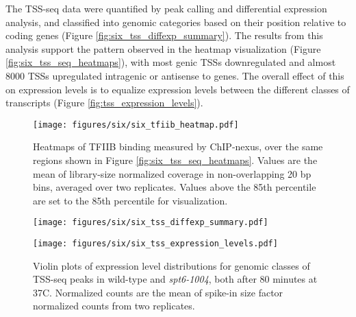 The TSS-seq data were quantified by peak calling and differential expression analysis, and classified into genomic categories based on their position relative to coding genes (Figure \ref{fig:six_tss_diffexp_summary}).
The results from this analysis support the pattern observed in the heatmap visualization (Figure \ref{fig:six_tss_seq_heatmaps}), with most genic TSSs downregulated and almost 8000 TSSs upregulated intragenic or antisense to genes.
The overall effect of this on expression levels is to equalize expression levels between the different classes of transcripts (Figure \ref{fig:tss_expression_levels}).

\begin{wrapfigure}[19]{R}{3in}
\centering
\texttt{[image: figures/six/six\_tfiib\_heatmap.pdf]}
\caption[Heatmaps of TFIIB ChIP-nexus protection over non-overlapping coding genes, from wild-type and \textit{spt6-1004} cells, both after 80 minutes at 37\textdegree C]{Heatmaps of TFIIB binding measured by ChIP-nexus, over the same regions shown in Figure \ref{fig:six_tss_seq_heatmaps}. Values are the mean of library-size normalized coverage in non-overlapping 20 bp bins, averaged over two replicates. Values above the 85th percentile are set to the 85th percentile for visualization.}
\label{fig:six_tfiib_heatmap}
\end{wrapfigure}

\lipsum

\begin{figure}[H]
    \centering
    \begin{minipage}[t]{2.875in}
        \centering
        \texttt{[image: figures/six/six\_tss\_diffexp\_summary.pdf]}
        \caption[Bar plots of the number of TSS-seq peaks in different genomic classes differentially expressed in \textit{spt6-1004} versus wild-type.]{Bar plots of the number of TSS-seq peaks differentially expressed in \textit{spt6-1004} after 80 minutes at 37\textdegree C versus wild-type after 80 minutes at 37\textdegree C. The height of each bar is proportional to the total number of peaks in the category, including those not found to be significantly differentially expressed.}
        \label{fig:six_tss_diffexp_summary}
    \end{minipage}\hfill
    \begin{minipage}[t]{2.875in}
        \centering
        \texttt{[image: figures/six/six\_tss\_expression\_levels.pdf]}
        \caption[Violin plots of expression level distributions for genomic classes of TSS-seq peaks in wild-type and  cells, both after 80 minutes at 37\textdegree C.]{Violin plots of expression level distributions for genomic classes of TSS-seq peaks in wild-type and \textit{spt6-1004}, both after 80 minutes at 37\textdegree C. Normalized counts are the mean of spike-in size factor normalized counts from two replicates.}
        \label{fig:six_tss_expression_levels}
    \end{minipage}
\end{figure}

